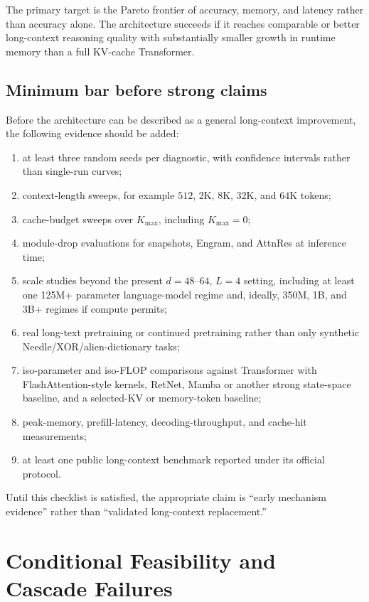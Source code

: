 \documentclass[11pt]{article}
\begin{document}
The primary target is the Pareto frontier of accuracy, memory, and latency rather than accuracy alone. The architecture succeeds if it reaches comparable or better long-context reasoning quality with substantially smaller growth in runtime memory than a full KV-cache Transformer.

\subsection{Minimum bar before strong claims}

Before the architecture can be described as a general long-context improvement, the following evidence should be added:
\begin{enumerate}
    \item at least three random seeds per diagnostic, with confidence intervals rather than single-run curves;
    \item context-length sweeps, for example $512$, $2$K, $8$K, $32$K, and $64$K tokens;
    \item cache-budget sweeps over $K_{\max}$, including $K_{\max}=0$;
    \item module-drop evaluations for snapshots, Engram, and AttnRes at inference time;
    \item scale studies beyond the present $d=48$--$64$, $L=4$ setting, including at least one 125M+ parameter language-model regime and, ideally, 350M, 1B, and 3B+ regimes if compute permits;
    \item real long-text pretraining or continued pretraining rather than only synthetic Needle/XOR/alien-dictionary tasks;
    \item iso-parameter and iso-FLOP comparisons against Transformer with FlashAttention-style kernels, RetNet, Mamba or another strong state-space baseline, and a selected-KV or memory-token baseline;
    \item peak-memory, prefill-latency, decoding-throughput, and cache-hit measurements;
    \item at least one public long-context benchmark reported under its official protocol.
\end{enumerate}
Until this checklist is satisfied, the appropriate claim is ``early mechanism evidence'' rather than ``validated long-context replacement.''

\section{Conditional Feasibility and Cascade Failures}
\end{document}
